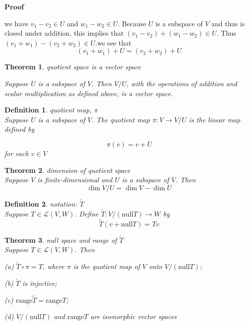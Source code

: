 \documentclass{article}
\newtheorem{theorem}{Theorem}[subsection]
\newtheorem{definition}{Definition}[subsection]
\newenvironment{cproof}{%
{
    \textbf{Proof\\}
    }
}{
}
\newcommand{\range}{\text{range}}
\newcommand{\n}{\text{null}}
\begin{document}
\begin{CJK}{UTF8}{gkai}
\begin{cproof}
    we have $v_1 -v_2 \in U$ and $w_1-w_2 \in U$. Because $U$ is a subspace of $V$ and thus is closed under addition, this implies that $(v_1 -v_2)+(w_1-w_2) \in U$. Thus $(v_1+w_1)-(v_2+w_2) \in U$.we see that
    \[(v_1 + w_1)+U = (v_2 +w_2)+U\]
    
\end{cproof}

\begin{theorem}
    quotient space is a vector space

    Suppose $U$ is a subspace of $V$. Then $V/U$, with the operations of addition and
 scalar multiplication as defined above, is a vector space.
\end{theorem}

\begin{definition}
    quotient map, $\pi$\\

    Suppose $U$ is a subspace of $V$. The quotient map $\pi: V \to  V/U$ is the linear map defined by

    \[\pi(v) = v+ U\]
    for each $v \in V$\\
\end{definition}

\begin{theorem}
    dimension of quotient space\\

    Suppose $V$ is finite-dimensional and $U$ is a subspace of $V$. Then
    \[\dim V/U = \dim V - \dim U\]
\end{theorem}

\begin{definition}
    notation: $\tilde{T}$\\

    Suppose $T \in \mathcal{L}(V,W)$. Define $\tilde{T}: V/(\n T) \to  W$ by
    \[\tilde{T}(v + \n T) =  Tv\]
\end{definition}

\begin{theorem}
    null space and range of $\tilde{T}$\\

    Suppose $T \in \mathcal{L}(V,W)$. Then

    (a) $\tilde{T} \circ \pi = T$, where $\pi$ is the quotient map of $V$ onto $V/(\n T)$;
    
    (b) $\tilde{T}$ is injective;

    (c) $\range \tilde{T} = \range T$;

    (d) $V/(\n T)$ and $\range T$ are isomorphic vector spaces\\
\end{theorem}


\end{CJK}
\end{document}

